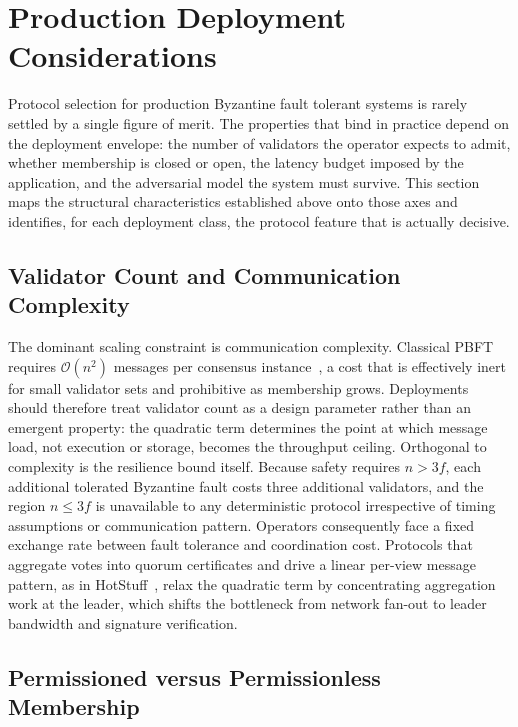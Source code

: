 \section{Production Deployment Considerations}

Protocol selection for production Byzantine fault tolerant systems is rarely settled by a single figure of merit. The properties that bind in practice depend on the deployment envelope: the number of validators the operator expects to admit, whether membership is closed or open, the latency budget imposed by the application, and the adversarial model the system must survive. This section maps the structural characteristics established above onto those axes and identifies, for each deployment class, the protocol feature that is actually decisive.

\subsection{Validator Count and Communication Complexity}

The dominant scaling constraint is communication complexity. Classical PBFT requires $\mathcal{O}(n^2)$ messages per consensus instance~\cite{castro1999practical}, a cost that is effectively inert for small validator sets and prohibitive as membership grows. Deployments should therefore treat validator count as a design parameter rather than an emergent property: the quadratic term determines the point at which message load, not execution or storage, becomes the throughput ceiling. Orthogonal to complexity is the resilience bound itself. Because safety requires $n > 3f$, each additional tolerated Byzantine fault costs three additional validators, and the region $n \leq 3f$ is unavailable to any deterministic protocol irrespective of timing assumptions or communication pattern. Operators consequently face a fixed exchange rate between fault tolerance and coordination cost. Protocols that aggregate votes into quorum certificates and drive a linear per-view message pattern, as in HotStuff~\cite{yin2019hotstuff}, relax the quadratic term by concentrating aggregation work at the leader, which shifts the bottleneck from network fan-out to leader bandwidth and signature verification.

\subsection{Permissioned versus Permissionless Membership}

